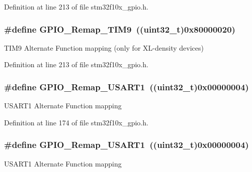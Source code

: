 Definition at line 213 of file stm32f10x\+\_\+gpio.\+h.

\subsubsection[{\texorpdfstring{G\+P\+I\+O\+\_\+\+Remap\+\_\+\+T\+I\+M9}{GPIO_Remap_TIM9}}]{\setlength{\rightskip}{0pt plus 5cm}\#define G\+P\+I\+O\+\_\+\+Remap\+\_\+\+T\+I\+M9~(({\bf uint32\+\_\+t})0x80000020)}\hypertarget{group___g_p_i_o___remap__define_gadfed4d88bc9a4093d16ce64a85b6051a}{}\label{group___g_p_i_o___remap__define_gadfed4d88bc9a4093d16ce64a85b6051a}
T\+I\+M9 Alternate Function mapping (only for X\+L-\/density devices) 

Definition at line 213 of file stm32f10x\+\_\+gpio.\+h.

\subsubsection[{\texorpdfstring{G\+P\+I\+O\+\_\+\+Remap\+\_\+\+U\+S\+A\+R\+T1}{GPIO_Remap_USART1}}]{\setlength{\rightskip}{0pt plus 5cm}\#define G\+P\+I\+O\+\_\+\+Remap\+\_\+\+U\+S\+A\+R\+T1~(({\bf uint32\+\_\+t})0x00000004)}\hypertarget{group___g_p_i_o___remap__define_ga804d946c5ca246a1f02f73a086586fd6}{}\label{group___g_p_i_o___remap__define_ga804d946c5ca246a1f02f73a086586fd6}
U\+S\+A\+R\+T1 Alternate Function mapping 

Definition at line 174 of file stm32f10x\+\_\+gpio.\+h.

\subsubsection[{\texorpdfstring{G\+P\+I\+O\+\_\+\+Remap\+\_\+\+U\+S\+A\+R\+T1}{GPIO_Remap_USART1}}]{\setlength{\rightskip}{0pt plus 5cm}\#define G\+P\+I\+O\+\_\+\+Remap\+\_\+\+U\+S\+A\+R\+T1~(({\bf uint32\+\_\+t})0x00000004)}\hypertarget{group___g_p_i_o___remap__define_ga804d946c5ca246a1f02f73a086586fd6}{}\label{group___g_p_i_o___remap__define_ga804d946c5ca246a1f02f73a086586fd6}
U\+S\+A\+R\+T1 Alternate Function mapping 

